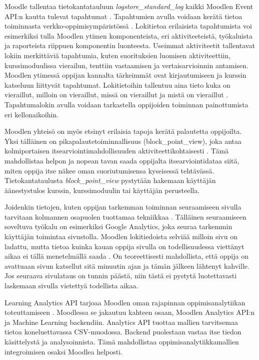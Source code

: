 Moodle tallentaa tietokantatauluun \emph{logstore\_standard\_log} kaikki Moodlen Event API:n kautta tulevat tapahtumat \citep{dougiamasMoodle2022, dougiamasLoggingMoodleDocs2021}. Tapahtumien avulla voidaan kerätä tietoa toiminnasta verkko-oppimisympäristössä \citep{agudo-peregrinaCanWePredict2014}. Lokitietoa erilaisista tapahtumista voi esimerkiksi tulla Moodlen ytimen komponenteista, eri aktiviteeteistä, työkaluista ja raporteista riippuen komponentin luonteesta. Useimmat aktiviteetit tallentavat lokiin merkittäviä tapahtumia, kuten suorituksien luomisen aktiviteettiin, kurssimoduulissa vierailun, tenttiin vastaamisen ja vertaisarvioinnin antamisen. Moodlen ytimessä oppijan kannalta tärkeimmät ovat kirjautumiseen ja kurssin katseluun liittyvät tapahtumat. Lokitietoihin tallentuu aina tieto kuka on vieraillut, milloin on vieraillut, missä on vieraillut ja mistä on vieraillut \citep{abdullahLearningStyleClassification2015}. Tapahtumalokin avulla voidaan tarkastella oppijoiden toiminnan painottumista eri kellonaikoihin.

Moodlen yhteisö on myös etsinyt erilaisia tapoja kerätä palautetta oppijoilta. Yksi tälläinen on pikapalautetoiminnallisuus (block\_point\_view), joka antaa kolmiportaisen itsearviointimahdollisuuden aktiviteettikohtaisesti \citep{fombaronMoodlePluginPoint2021}. Tämä mahdollistaa helpon ja nopean tavan saada oppijalta itsearviointidataa siitä, miten oppija itse näkee oman suoriutumisensa kyseisessä tehtävässä. Tietokantataulusta \emph{block\_point\_view} pystytään hakemaan käyttäjän äänestystulos kurssin, kurssimoduulin tai käyttäjän perusteella.

Joidenkin tietojen, kuten oppijan tarkemman toiminnan seuraamiseen sivulla tarvitaan kolmannen osapuolen tuottamaa tekniikkaa \citep{filvaGoogleAnalyticsTime2014}. Tälläinen seuraamiseen soveltuva työkalu on esimerkiksi Google Analytics, joka seuraa tarkemmin käyttäjän toimintaa sivustolla. Moodlen lokitiedoista selviää milloin sivu on ladattu, mutta tietoa kuinka kauan oppija sivulla on todellisuudessa viettänyt aikaa ei tällä menetelmällä saada \citep{dougiamasMoodle2022}. On teoreettisesti mahdollista, että oppija on avattuaan sivun katsellut sitä minuutin ajan ja tämän jälkeen lähtenyt kahville. Jos seuraava sivulataus on tunnin päästä, niin tästä ei pystytä luotettavasti laskemaan sivulla vietettyä todellista aikaa.

\color{blue}
Learning Analytics API tarjoaa Moodlen oman rajapinnan oppimisanalytiikan toteuttamiseen \citep{oliveSupervisedLearningFramework2018}. Moodlessa se jakautuu kahteen osaan, Moodlen Analytics API:n ja Machine Learning backendiin. Analytics API tuottaa mallien tarvitsemaa tietoa koneluettavassa CSV-muodossa. Backend puolestaan vastaa itse tiedon käsittelystä ja analysoinnista. Tämä mahdollistaa oppimisanalytiikkamallien integroimisen osaksi Moodlea helposti.
\color{black}

